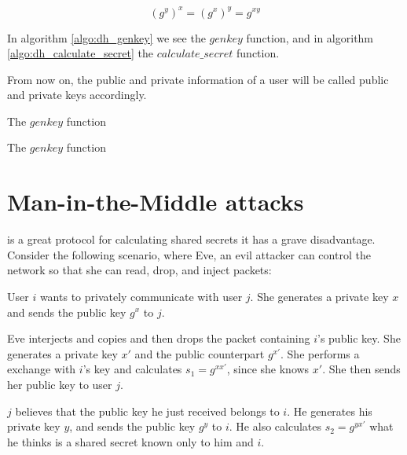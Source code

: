 \[
  (g^y)^x = (g^x)^y = g^{xy}
\]

In algorithm \ref{algo:dh_genkey} we see the $genkey$ function, and in algorithm \ref{algo:dh_calculate_secret} the $calculate\_secret$ function.

From now on, the public and private information of a user will be called public and private keys accordingly.

\begin{algorithm}[h]
  \caption{The $genkey$ function}
  \label{algo:dh_genkey}
\end{algorithm}

\begin{algorithm}[h]
  \caption{The $genkey$ function}
  \label{algo:dh_calculate_secret}
\end{algorithm}

\section{Man-in-the-Middle attacks}

\dhname is a great protocol for calculating shared secrets it has a grave disadvantage.
Consider the following scenario, where Eve, an evil attacker can control the network so that she can read, drop, and inject packets:

User $i$ wants to privately communicate with user $j$.
She generates a private key $x$ and sends the public key $g^x$ to $j$.

Eve interjects and copies and then drops the packet containing $i$'s public key.
She generates a private key $x\prime$ and the public counterpart $g^{x\prime}$.
She performs a \dhname exchange with $i$'s key and calculates $s_1 = g^{xx\prime}$, since she knows $x\prime$.
She then sends her public key to user $j$.

$j$ believes that the public key he just received belongs to $i$.
He generates his private key $y$, and sends the public key $g^y$ to $i$.
He also calculates $s_2 = g^{yx\prime}$ what he thinks is a shared secret known only to him and $i$.

